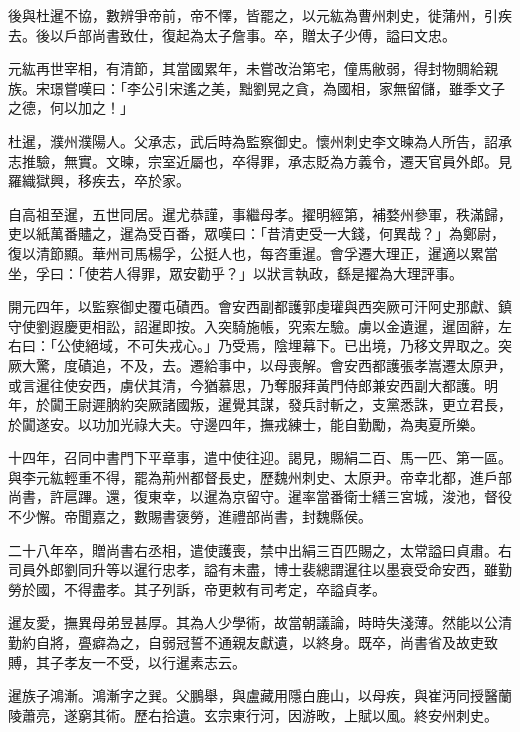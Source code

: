 \begin{pinyinscope}
 後與杜暹不協，數辨爭帝前，帝不懌，皆罷之，以元紘為曹州刺史，徙蒲州，引疾去。後以戶部尚書致仕，復起為太子詹事。卒，贈太子少傅，謚曰文忠。



 元紘再世宰相，有清節，其當國累年，未嘗改治第宅，僮馬敝弱，得封物賙給親族。宋璟嘗嘆曰：「李公引宋遙之美，黜劉晃之貪，為國相，家無留儲，雖季文子之德，何以加之！」



 杜暹，濮州濮陽人。父承志，武后時為監察御史。懷州刺史李文暕為人所告，詔承志推驗，無實。文暕，宗室近屬也，卒得罪，承志貶為方義令，遷天官員外郎。見羅織獄興，移疾去，卒於家。



 自高祖至暹，五世同居。暹尤恭謹，事繼母孝。擢明經第，補婺州參軍，秩滿歸，吏以紙萬番贐之，暹為受百番，眾嘆曰：「昔清吏受一大錢，何異哉？」為鄭尉，復以清節顯。華州司馬楊孚，公挺人也，每咨重暹。會孚遷大理正，暹適以累當坐，孚曰：「使若人得罪，眾安勸乎？」以狀言執政，繇是擢為大理評事。



 開元四年，以監察御史覆屯磧西。會安西副都護郭虔瓘與西突厥可汗阿史那獻、鎮守使劉遐慶更相訟，詔暹即按。入突騎施帳，究索左驗。虜以金遺暹，暹固辭，左右曰：「公使絕域，不可失戎心。」乃受焉，陰埋幕下。已出境，乃移文畀取之。突厥大驚，度磧追，不及，去。遷給事中，以母喪解。會安西都護張孝嵩遷太原尹，或言暹往使安西，虜伏其清，今猶慕思，乃奪服拜黃門侍郎兼安西副大都護。明年，於闐王尉遲朒約突厥諸國叛，暹覺其謀，發兵討斬之，支黨悉誅，更立君長，於闐遂安。以功加光祿大夫。守邊四年，撫戎練士，能自勤勵，為夷夏所樂。



 十四年，召同中書門下平章事，遣中使往迎。謁見，賜絹二百、馬一匹、第一區。與李元紘輕重不得，罷為荊州都督長史，歷魏州刺史、太原尹。帝幸北都，進戶部尚書，許扈蹕。還，復東幸，以暹為京留守。暹率當番衛士繕三宮城，浚池，督役不少懈。帝聞嘉之，數賜書褒勞，進禮部尚書，封魏縣侯。



 二十八年卒，贈尚書右丞相，遣使護喪，禁中出絹三百匹賜之，太常謚曰貞肅。右司員外郎劉同升等以暹行忠孝，謚有未盡，博士裴總謂暹往以墨衰受命安西，雖勤勞於國，不得盡孝。其子列訴，帝更敕有司考定，卒謚貞孝。



 暹友愛，撫異母弟昱甚厚。其為人少學術，故當朝議論，時時失淺薄。然能以公清勤約自將，亹癖為之，自弱冠誓不通親友獻遺，以終身。既卒，尚書省及故吏致賻，其子孝友一不受，以行暹素志云。



 暹族子鴻漸。鴻漸字之巽。父鵬舉，與盧藏用隱白鹿山，以母疾，與崔沔同授醫蘭陵蕭亮，遂窮其術。歷右拾遺。玄宗東行河，因游畋，上賦以風。終安州刺史。




\end{pinyinscope}
